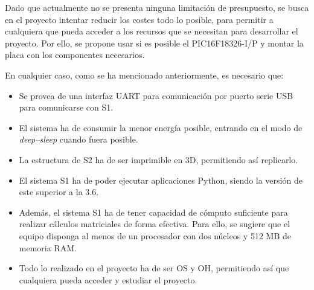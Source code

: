 Dado que actualmente no se presenta ninguna limitación de presupuesto, se busca en el proyecto intentar reducir los costes todo lo posible, para permitir a cualquiera que pueda acceder a los recursos que se necesitan para desarrollar el proyecto. Por ello, se propone usar si es posible el PIC16F18326-I/P y montar la placa con los componentes necesarios.

En cualquier caso, como se ha mencionado anteriormente, es necesario que:

\begin{itemize}
    \item Se provea de una interfaz UART para comunicación por puerto serie \ac{USB} para comunicarse con \ac{S1}.
    \item El sistema ha de consumir la menor energía posible, entrando en el modo de \textit{deep--sleep} cuando fuera posible.
    \item La estructura de \ac{S2} ha de ser imprimible en 3D, permitiendo así replicarlo.
    \item El sistema \ac{S1} ha de poder ejecutar aplicaciones Python, siendo la versión de este superior a la 3.6.
    \item Además, el sistema \ac{S1} ha de tener capacidad de cómputo suficiente para realizar cálculos matriciales de forma efectiva. Para ello, se sugiere que el equipo disponga al menos de un procesador con dos núcleos y 512 MB de memoria RAM.
    \item Todo lo realizado en el proyecto ha de ser \ac{OS} y \ac{OH}, permitiendo así que cualquiera pueda acceder y estudiar el proyecto.
\end{itemize}